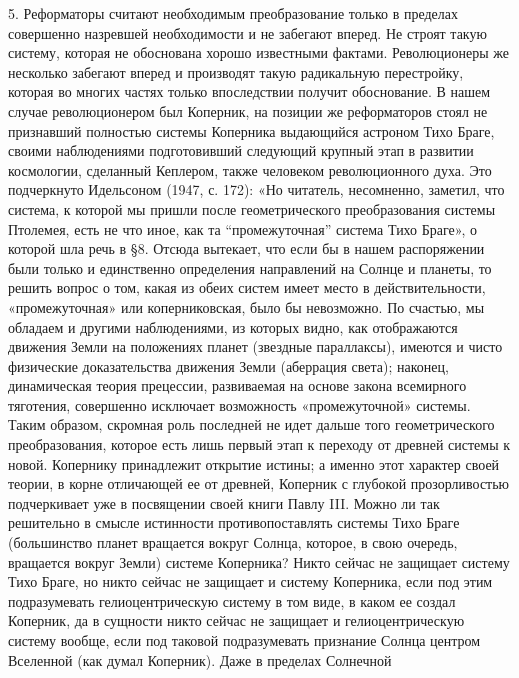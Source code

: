 5. Реформаторы  считают необходимым  преобразование только  в пределах
совершенно  назревшей необходимости  и не  забегают вперед.  Не строят
такую  систему,  которая  не  обоснована  хорошо  известными  фактами.
Революционеры  же   несколько  забегают  вперед  и   производят  такую
радикальную перестройку, которая во  многих частях только впоследствии
получит  обоснование.  В  нашем случае  революционером  был  Коперник,
на  позиции  же реформаторов  стоял  не  признавший полностью  системы
Коперника   выдающийся  астроном   Тихо  Браге,   своими  наблюдениями
подготовивший следующий крупный этап  в развитии космологии, сделанный
Кеплером,  также   человеком  революционного  духа.   Это  подчеркнуто
Идельсоном  (1947, с.  172):  «Но читатель,  несомненно, заметил,  что
система,  к которой  мы  пришли  после геометрического  преобразования
системы Птолемея, есть  не что иное, как  та ``промежуточная'' система
Тихо  Браге», о  которой  шла речь  в §8.  Отсюда  вытекает, что  если
бы  в  нашем  распоряжении   были  только  и  единственно  определения
направлений на  Солнце и  планеты, то  решить вопрос  о том,  какая из
обеих  систем  имеет  место в  действительности,  «промежуточная»  или
коперниковская, было бы невозможно. По  счастью, мы обладаем и другими
наблюдениями,  из которых  видно, как  отображаются движения  Земли на
положениях планет  (звездные параллаксы),  имеются и  чисто физические
доказательства движения Земли (аберрация света); наконец, динамическая
теория прецессии,  развиваемая на основе закона  всемирного тяготения,
совершенно  исключает   возможность  «промежуточной»   системы.  Таким
образом, скромная  роль последней не идет  дальше того геометрического
преобразования, которое  есть лишь первый  этап к переходу  от древней
системы  к  новой. Копернику  принадлежит  открытие  истины; а  именно
этот  характер  своей  теории,  в  корне  отличающей  ее  от  древней,
Коперник  с  глубокой  прозорливостью подчеркивает  уже  в  посвящении
своей книги  Павлу III.  Можно ли так  решительно в  смысле истинности
противопоставлять  системы Тихо  Браге  (большинство планет  вращается
вокруг  Солнца,  которое,  в  свою очередь,  вращается  вокруг  Земли)
системе  Коперника?  Никто  сейчас  не защищает  систему  Тихо  Браге,
но  никто  сейчас не  защищает  и  систему  Коперника, если  под  этим
подразумевать гелиоцентрическую систему в том  виде, в каком ее создал
Коперник, да в  сущности никто сейчас не  защищает и гелиоцентрическую
систему  вообще,  если  под  таковой  подразумевать  признание  Солнца
центром  Вселенной (как  думал  Коперник). Даже  в пределах  Солнечной
